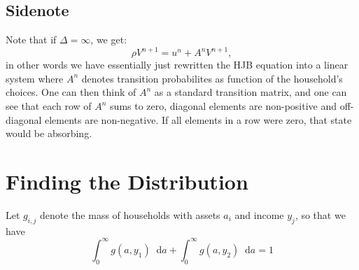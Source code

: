 \documentclass[12pt]{article}
\DeclareMathOperator{\1}{\mathbbm{1}}
\newcommand*\diff{\mathop{}\!\mathrm{d}}
\begin{document}
\subsection{Sidenote}
Note that if $\Delta = \infty$, we get:
\begin{equation}
\rho V^{n+1} = u^n + A^n V^{n+1},
\end{equation}
in other words we have essentially just rewritten the HJB equation into a linear system where $A^n$ denotes transition probabilites  as function of the household's choices. One can then think of $A^n$ as a standard transition matrix, and one can see that each row of $A^n$ sums to zero, diagonal elements are non-positive and off-diagonal elements are non-negative. If all elements in a row were zero, that state would be absorbing.


\section{Finding the Distribution}
Let $g_{i,j}$ denote the mass of households with assets $a_i$ and income $y_j$, so that we have
\begin{equation}
\int_0^\infty g(a,y_1)\diff a + \int_0^\infty g(a,y_2)\diff a =1
\end{equation}
\end{document}
